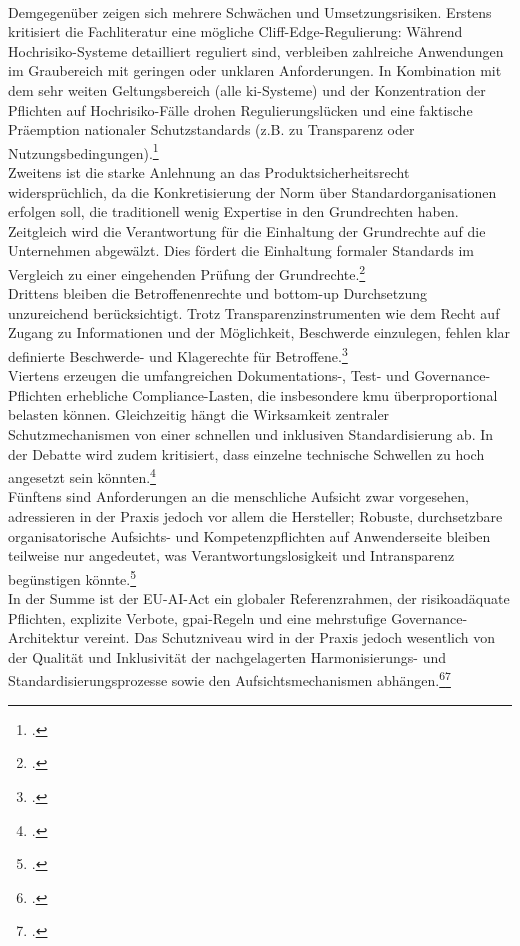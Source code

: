 \\
Demgegenüber zeigen sich mehrere Schwächen und Umsetzungsrisiken.
Erstens kritisiert die Fachliteratur eine mögliche \glqq{}Cliff-Edge\grqq{}-Regulierung: Während Hochrisiko-Systeme detailliert reguliert sind, verbleiben zahlreiche Anwendungen im Graubereich mit geringen oder unklaren Anforderungen.
In Kombination mit dem sehr weiten Geltungsbereich (\glqq{}alle \ac{ki}-Systeme\grqq{}) und der Konzentration der Pflichten auf Hochrisiko-Fälle drohen Regulierungslücken und eine faktische Präemption nationaler Schutzstandards (z.B. zu Transparenz oder Nutzungsbedingungen).\footcite[108-109]{vealeDemystifyingDraftEU2021}
\\
Zweitens ist die starke Anlehnung an das Produktsicherheitsrecht widersprüchlich, da die Konkretisierung der Norm über Standardorganisationen erfolgen soll, die traditionell wenig Expertise in den Grundrechten haben.
Zeitgleich wird die Verantwortung für die Einhaltung der Grundrechte auf die Unternehmen abgewälzt.
Dies fördert die Einhaltung formaler Standards im Vergleich zu einer eingehenden Prüfung der Grundrechte.\footcite[102;106]{vealeDemystifyingDraftEU2021}
\\
Drittens bleiben die Betroffenenrechte und \glqq{}bottom-up\grqq{} Durchsetzung unzureichend berücksichtigt.
Trotz Transparenzinstrumenten wie dem Recht auf Zugang zu Informationen und der Möglichkeit, Beschwerde einzulegen, fehlen klar definierte Beschwerde- und Klagerechte für Betroffene.\footcite[111-112]{vealeDemystifyingDraftEU2021}
\\
Viertens erzeugen die umfangreichen Dokumentations-, Test- und Governance-Pflichten erhebliche Compliance-Lasten, die insbesondere \ac{kmu} überproportional belasten können.
Gleichzeitig hängt die Wirksamkeit zentraler Schutzmechanismen von einer schnellen und inklusiven Standardisierung ab.
In der Debatte wird zudem kritisiert, dass einzelne technische Schwellen zu hoch angesetzt sein könnten.\footcite[11]{europeanparliamentaryresearchserviceArtificialIntelligenceAct2024}
\\
Fünftens sind Anforderungen an die menschliche Aufsicht zwar vorgesehen, adressieren in der Praxis jedoch vor allem die Hersteller; Robuste, durchsetzbare organisatorische Aufsichts- und Kompetenzpflichten auf Anwenderseite bleiben teilweise nur angedeutet, was Verantwortungslosigkeit und Intransparenz begünstigen könnte.\footcite[107-108]{vealeDemystifyingDraftEU2021}
\\
In der Summe ist der EU-AI-Act ein globaler Referenzrahmen, der risikoadäquate Pflichten, explizite Verbote, \ac{gpai}-Regeln und eine mehrstufige Governance-Architektur vereint.
Das Schutzniveau wird in der Praxis jedoch wesentlich von der Qualität und Inklusivität der nachgelagerten Harmonisierungs- und Standardisierungsprozesse sowie den Aufsichtsmechanismen abhängen.\footcite[11]{europeanparliamentaryresearchserviceArtificialIntelligenceAct2024}\footcite[112]{vealeDemystifyingDraftEU2021}

